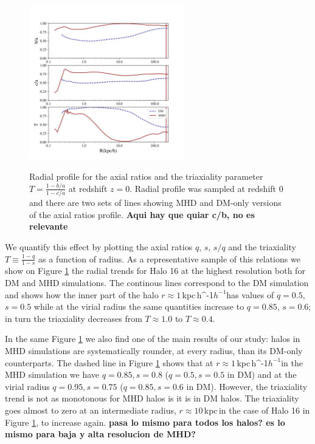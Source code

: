 \documentclass[a4paper,fleqn,usenatbib]{mnras}
\newcommand{\kpch}{\,{\rm kpc}\,\ifmmode h^{-1}\else $h^{-1}$\fi}
\newcommand{\kpc}{\,{\rm kpc}\,}
\begin{document}
\begin{figure}
\centering
{\includegraphics[width=0.6\textwidth]{./pics/MHD_Vs_DM/halo16_new.png}}
\caption{Radial profile for the axial ratios and the triaxiality parameter
  $T=\frac{1-b/a}{1-c/a}$ at redshift $z=0$. 
  Radial profile was sampled at
  redshift 0 and there are two sets of lines showing MHD and DM-only
  versions of the axial ratios profile. {\bf Aqui hay que quiar c/b,
    no es relevante}} \label{fig:triaxial_radius}
\end{figure} 


We quantify this effect by plotting the axial ratios $q$, $s$,
$s/q$ and the triaxiality $T\equiv \frac{1-q}{1-s}$ as a
function of radius. 
As a representative sample of this relations we show on Figure
\ref{fig:triaxial_radius} the radial trends for Halo 16 at
the highest resolution both for DM and MHD simulations.
The continous lines correspond to the DM simulation and shows how
the inner part of the halo $r\approx 1$\kpch has values of 
$q=0.5$, $s=0.5$ while at the virial radius the same
quantities increase to $q=0.85$, $s=0.6$; in turn the triaxiality
decreases from $T\approx 1.0$ to $T\approx0.4$. 

In the same Figure \ref{fig:triaxial_radius} we also find one of the
main results of our study: halos in MHD simulations are systematically rounder, at
every radius, than its DM-only counterparts.  
The dashed line in Figure \ref{fig:triaxial_radius} shows that at
$r\approx 1$\kpch  in the MHD simulation we have $q=0.85, s=0.8$
($q=0.5, s=0.5$ in DM) and at the virial radius $q=0.95, s=0.75$
($q=0.85, s=0.6$ in DM).  
However, the triaxiality trend is not as monotonous for MHD halos is
it is in DM halos. 
The triaxiality goes almost to zero at an intermediate radius,
$r\approx 10$\kpc in the case of Halo 16 in Figure
\ref{fig:triaxial_radius}, to increase again. {\bf pasa lo mismo para
  todos los halos? es lo mismo para baja y alta resolucion de MHD?}
    
\end{document}

